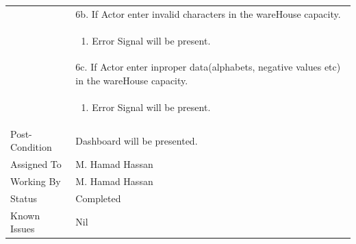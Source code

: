 \documentclass[12pt,a4paper]{article}
\begin{document}
\begin{longtable}{| p{3cm}|p{12cm}|}
& 6b. If Actor enter invalid characters in the wareHouse capacity. \\
& \begin{enumerate}
		\item Error Signal will be present.
	\end{enumerate}
\\ 
& 6c. If Actor enter inproper data(alphabets, negative values etc) in the wareHouse capacity. \\
& \begin{enumerate}
		\item Error Signal will be present.
	\end{enumerate}
\\ \hline 
Post-Condition &  Dashboard will be presented.  \\ \hline
Assigned To &  M. Hamad Hassan
\\ \hline
Working By &    M. Hamad Hassan
\\ \hline
Status & 	Completed	
\\ \hline
Known Issues & Nil
\\\hline
\end{longtable}


\end{document}
